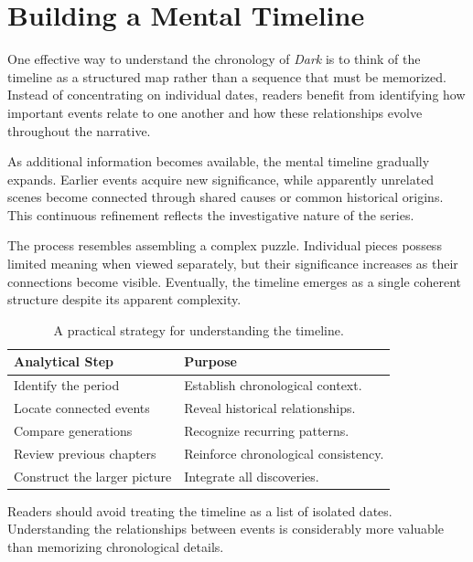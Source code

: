 \documentclass[12pt,oneside,openany]{book}
\begin{document}
\section{Building a Mental Timeline}

One effective way to understand the chronology of \textit{Dark} is to think of
the timeline as a structured map rather than a sequence that must be memorized.
Instead of concentrating on individual dates, readers benefit from identifying
how important events relate to one another and how these relationships evolve
throughout the narrative.

As additional information becomes available, the mental timeline gradually
expands. Earlier events acquire new significance, while apparently unrelated
scenes become connected through shared causes or common historical origins.
This continuous refinement reflects the investigative nature of the series.

The process resembles assembling a complex puzzle. Individual pieces possess
limited meaning when viewed separately, but their significance increases as
their connections become visible. Eventually, the timeline emerges as a single
coherent structure despite its apparent complexity.

\begin{table}[H]
\centering
\begin{tabular}{|p{4cm}|p{8cm}|}
\hline
\textbf{Analytical Step} & \textbf{Purpose}\\
\hline
Identify the period & Establish chronological context.\\
\hline
Locate connected events & Reveal historical relationships.\\
\hline
Compare generations & Recognize recurring patterns.\\
\hline
Review previous chapters & Reinforce chronological consistency.\\
\hline
Construct the larger picture & Integrate all discoveries.\\
\hline
\end{tabular}
\caption{A practical strategy for understanding the timeline.}
\end{table}

\begin{tcolorbox}[colback=cyan!5,colframe=cyan!60!black,title=Reading Tip]
Readers should avoid treating the timeline as a list of isolated dates.
Understanding the relationships between events is considerably more valuable
than memorizing chronological details.
\end{tcolorbox}
\end{document}

